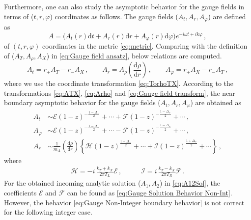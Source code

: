 \documentclass[11pt,a4paper]{article}
\newcommand{\td}{\text{d}}
\newcommand{\dd}{\mathrm{d}}
\begin{document}
Furthermore, one can also study the asymptotic behavior for the gauge fields in terms of ($t, r, \varphi$) coordinates as follows.
The gauge fields ($A_t,A_r,A_\varphi$) are defined as
\begin{equation} \label{eq:Gauge field ansatz 2}
    A = \Big(A_{t}(r) \td t + A_{r}(r) \td r + A_{\varphi}(r) \td \varphi \Big) e^{-i \omega t + i k \varphi}\,,
\end{equation}
of $(t,r,\varphi)$ coordinates in the metric \eqref{eq:metric}. Comparing with the definition of ($A_T,A_\rho,A_X$) in \eqref{eq:Gauge field ansatz}, below relations are computed.
\begin{equation}\label{eq:Gauge field transform}
    A_t = r_+ A_T - r_- A_X\,, \qquad A_r = A_\rho \left(\frac{\dd \rho}{\dd r}\right) \,, \qquad A_\varphi = r_+ A_X - r_- A_T\,,
\end{equation}
where we use the coordinate transformation \eqref{eq:TorhoTX}. According to the transformations \eqref{eq:ATX}, \eqref{eq:Arho} and \eqref{eq:Gauge field transform}, the near boundary asymptotic behavior for the gauge fields ($A_t,A_r,A_\varphi$) are obtained as
\begin{equation}\label{eq:Gauge Non-Integer boundary behavior}
\begin{split}
    A_t &\sim \mathcal{E} (1-z)^{-\frac{1-\Delta_-}{2}} + \cdots + \mathcal{F} (1-z)^{-\frac{1-\Delta_+}{2}} + \cdots\,,\\
    A_\varphi &\sim \mathcal{E} (1-z)^{-\frac{1-\Delta_-}{2}} + \cdots - \mathcal{F} (1-z)^{-\frac{1-\Delta_+}{2}} + \cdots\,,\\
    A_r &\sim \frac{1}{m_A} \left(\frac{\dd \rho}{\dd r}\right) \left\{\mathcal{H} (1-z)^{\frac{1+\Delta_-}{2}} + \cdots + \mathcal{I} (1-z)^{\frac{1+\Delta_+}{2}} + \cdots\right\}\,,
\end{split}
\end{equation}
where
\begin{equation} \label{eq:HJrelation}
\begin{split}
    \mathcal{H}=-i\,\frac{k_T + k_X}{2\pi T_L}\mathcal{E}\,, \qquad
    &\mathcal{I}=i\,\frac{k_T - k_X}{2\pi T_R}\mathcal{F}\,.
\end{split}
\end{equation}
For the obtained incoming analytic solution ($A_1,A_2$) in \eqref{eq:A12Sol}, the coefficients $\mathcal{E}$ and $\mathcal{F}$ can be found as \eqref{eq:Gauge Solution Behavior Non-Int}. However, the behavior \eqref{eq:Gauge Non-Integer boundary behavior} is not correct for the following integer case.
\end{document}
